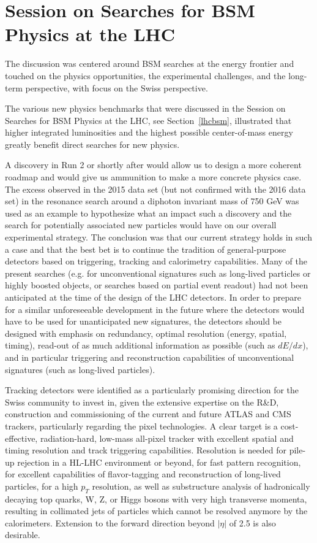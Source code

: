 \section{Session on Searches for BSM Physics at the LHC}\label{discussionsearches}

The discussion was centered around BSM searches at the energy frontier and touched on the physics opportunities, the experimental challenges, and the long-term perspective, with focus on the Swiss perspective.

The various new physics benchmarks that were discussed in the Session on Searches for BSM Physics at the LHC, see Section~\ref{lhcbsm}, illustrated that higher integrated luminosities and the highest possible center-of-mass energy greatly benefit direct searches for new physics.

A discovery in Run 2 or shortly after would allow us to design a more coherent roadmap and would give us ammunition to make a more concrete physics case.  The excess observed in the 2015 data set (but not confirmed with the 2016 data set) in the resonance search around a diphoton invariant mass of 750 GeV was used as an example to hypothesize what an impact such a discovery and the search for potentially associated new particles would have on our overall experimental strategy.  The conclusion was that our current strategy holds in such a case and that the best bet is to continue the tradition of general-purpose detectors based on triggering, tracking and calorimetry capabilities.  Many of the present searches (e.g. for unconventional signatures such as long-lived particles or highly boosted objects, or searches based on partial event readout) had not been anticipated at the time of the design of the LHC detectors.  In order to prepare for a similar unforeseeable development in the future where the detectors would have to be used for unanticipated new signatures, the detectors should be designed with emphasis on redundancy, optimal resolution (energy, spatial, timing), read-out of as much additional information as possible (such as $dE/dx$), and in particular triggering and reconstruction capabilities of unconventional signatures (such as long-lived particles).

Tracking detectors were identified as a particularly promising direction for the Swiss community to invest in, given the extensive expertise on the R\&D, construction and commissioning of the current and future ATLAS and CMS trackers, particularly regarding the pixel technologies.  A clear target is a cost-effective, radiation-hard, low-mass all-pixel tracker with excellent spatial and timing resolution and track triggering capabilities.  Resolution is needed for pile-up rejection in a HL-LHC environment or beyond, for fast pattern recognition, for excellent capabilities of flavor-tagging and reconstruction of long-lived particles, for a high $p_T$ resolution, as well as substructure analysis of hadronically decaying top quarks, W, Z, or Higgs bosons with very high transverse momenta, resulting in collimated jets of particles which cannot be resolved anymore by the calorimeters.  Extension to the forward direction beyond $|\eta |$ of 2.5 is also desirable.

